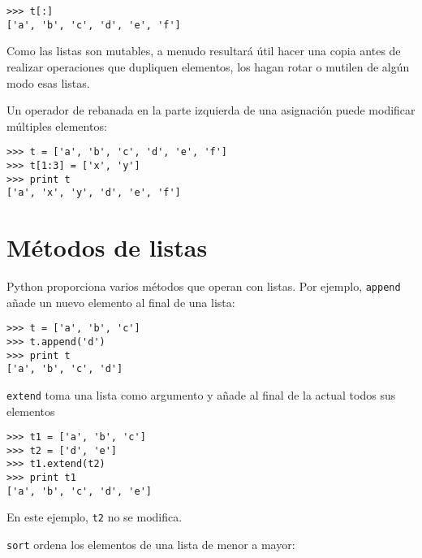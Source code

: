 
\beforeverb
\begin{verbatim}
>>> t[:]
['a', 'b', 'c', 'd', 'e', 'f']
\end{verbatim}
\afterverb
%
Como las listas son mutables, a menudo resultará útil hacer una copia
antes de realizar operaciones que dupliquen elementos, los hagan rotar o mutilen
de algún modo esas listas.


Un operador de rebanada en la parte izquierda de una asignación
puede modificar múltiples elementos:


\beforeverb
\begin{verbatim}
>>> t = ['a', 'b', 'c', 'd', 'e', 'f']
>>> t[1:3] = ['x', 'y']
>>> print t
['a', 'x', 'y', 'd', 'e', 'f']
\end{verbatim}
\afterverb
%

\section{Métodos de listas}


Python proporciona varios métodos que operan con listas. Por ejemplo,
{\tt append} añade un nuevo elemento al final de una lista:


\beforeverb
\begin{verbatim}
>>> t = ['a', 'b', 'c']
>>> t.append('d')
>>> print t
['a', 'b', 'c', 'd']
\end{verbatim}
\afterverb
%
{\tt extend} toma una lista como argumento y añade al final de la actual
todos sus elementos


\beforeverb
\begin{verbatim}
>>> t1 = ['a', 'b', 'c']
>>> t2 = ['d', 'e']
>>> t1.extend(t2)
>>> print t1
['a', 'b', 'c', 'd', 'e']
\end{verbatim}
\afterverb
%
En este ejemplo, {\tt t2} no se modifica.

{\tt sort} ordena los elementos de una lista de menor a mayor:


